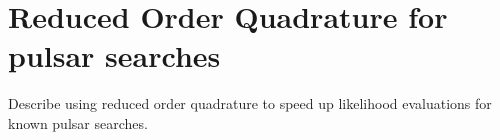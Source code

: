 \section{Reduced Order Quadrature for pulsar searches}

Describe using reduced order quadrature to speed up likelihood evaluations for known pulsar searches.